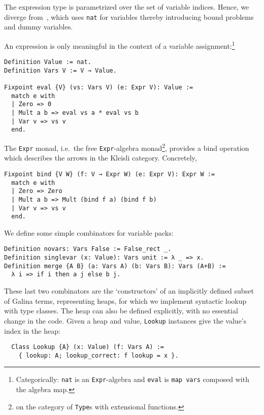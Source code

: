 \documentclass[a4paper,10pt,runningheads]{llncs}
\begin{document}
The expression type is parametrized over the set of variable indices. Hence, we diverge from~\cite{Hints}, 
which uses \lstinline|nat| for variables thereby introducing bound problems and dummy variables.

 An expression is only meaningful in the context of a variable
assignment:\footnote{Categorically: \lstinline|nat| is
an \lstinline|Expr|-algebra and \lstinline|eval| is \lstinline|map vars| composed with the algebra map.}
\begin{lstlisting}
Definition Value := nat.
Definition Vars V := V → Value.

Fixpoint eval {V} (vs: Vars V) (e: Expr V): Value :=
  match e with
  | Zero => 0
  | Mult a b => eval vs a * eval vs b
  | Var v => vs v
  end.
\end{lstlisting}

The \lstinline|Expr| monad, i.e.\ the free \lstinline|Expr|-algebra monad\footnote{on the category of \lstinline|Type|s with extensional functions.%
}, provides a bind operation which describes the arrows in the Kleisli category. Concretely,
\begin{lstlisting}
Fixpoint bind {V W} (f: V → Expr W) (e: Expr V): Expr W :=
  match e with
  | Zero => Zero
  | Mult a b => Mult (bind f a) (bind f b)
  | Var v => vs v
  end.
\end{lstlisting}



\noindent We define some simple combinators for variable packs:
%
\begin{lstlisting}
Definition novars: Vars False := False_rect _.
Definition singlevar (x: Value): Vars unit := λ _ => x.
Definition merge {A B} (a: Vars A) (b: Vars B): Vars (A+B) :=
  λ i => if i then a j else b j.
\end{lstlisting}


\noindent These last two combinators are the `constructors' of an implicitly defined subset of
 Galina terms, representing heaps, for which we implement syntactic lookup with type classes.
The heap can also be defined explicitly, with no essential change in the code.
Given a heap and value, \lstinline|Lookup| instances give the value's index in the heap:
\begin{lstlisting}
  Class Lookup {A} (x: Value) (f: Vars A) :=
    { lookup: A; lookup_correct: f lookup = x }.
\end{lstlisting}
\end{document}
